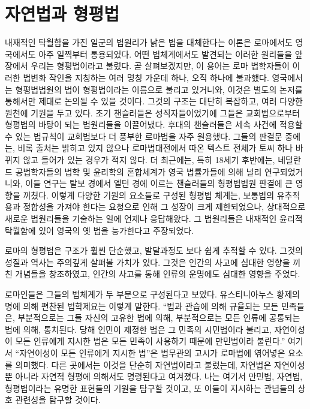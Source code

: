 \chapter{자연법과 형평법}

내재적인 탁월함을 가진
일군의 법원리가
낡은 법을 대체한다는 이론은
로마에서도 영국에서도 아주 일찍부터 통용되었다.
어떤 법체계에서도 발견되는
이러한 원리들을 앞 장에서 우리는 형평법이라고 불렀다.
곧 살펴보겠지만, 이 용어는
로마 법학자들이 이러한 법변화 작인을 지칭하는
여러 명칭 가운데 하나, 오직 하나에 불과했다.
영국에서는 형평법법원의 법이
형평법이라는 이름으로 불리고 있거니와,
이것은 별도의 논저를 통해서만 제대로 논의될 수 있을 것이다.
그것의 구조는 대단히 복잡하고, 여러 다양한 원천에 기원을 두고 있다.
초기 챈슬러들은 성직자들이었기에 그들은 교회법으로부터
형평법의 바탕이 되는 법원리들을 이끌어냈다.
후대의 챈슬러들은
세속 사건에 적용할 수 있는 법규칙이 교회법보다 더 풍부한 로마법을
자주 원용했다.
그들의 판결문 중에는, 비록 출처는 밝히고 있지 않으나
로마법대전에서 따온 텍스트 전체가 토씨 하나 바뀌지 않고
들어가 있는 경우가 적지 않다.
더 최근에는, 특히 18세기 후반에는,
네덜란드 공법학자들의 법학 및 윤리학의 혼합체계가 영국 법률가들에 의해
널리 연구되었거니와,
이들 연구는
탈보 경에서 엘던 경에 이르는
챈슬러들의 형평법법원 판결에 큰 영향을 끼쳤다.
이렇게 다양한 기원의 요소들로 구성된 형평법 체계는,
보통법의 유추적용과 정합성을 가져야 한다는 요청으로 인해
그 성장이 크게 제한되었으나,
상대적으로 새로운 법원리들을 기술하는 일에 언제나 응답해왔다.
그 법원리들은 내재적인 윤리적 탁월함에 있어 영국의 옛 법을 능가한다고
주장되었다.

로마의 형평법은 구조가 훨씬 단순했고, 발달과정도 보다 쉽게 추적할 수 있다.
그것의 성질과 역사는 주의깊게 살펴볼 가치가 있다.
그것은 인간의 사고에 심대한 영향을 끼친 개념들을 창조하였고,
인간의 사고를 통해 인류의 운명에도 심대한 영향을 주었다.

로마인들은 그들의 법체계가 두 부분으로 구성된다고 보았다.
유스티니아누스 황제의 명에 의해 편찬된 법학제요는 이렇게 말한다.
``법과 관습에 의해 규율되는 모든 민족들은, 부분적으로는 그들 자신의
고유한 법에 의해, 부분적으로는 모든 인류에 공통되는 법에 의해,
통치된다. 당해 인민이 제정한 법은 그 민족의 시민법이라
불리고, 자연이성이 모든 인류에게 지시한 법은
모든 민족이 사용하기 때문에
만민법이라 불린다.''
여기서 ``자연이성이 모든 인류에게 지시한 법''은 법무관의 고시가
로마법에 엮어넣은 요소를 의미했다.
다른 곳에서는 이것을 단순히 자연법이라고 불렀는데,
자연법은 자연이성뿐 아니라 자연적 형평에 의해서도
명령된다고 여겨졌다.
나는 여기서 만민법, 자연법, 형평법이라는 유명한 표현들의 기원을 탐구할 것이고,
또 이들이 지시하는 관념들의 상호 관련성을 탐구할 것이다.

